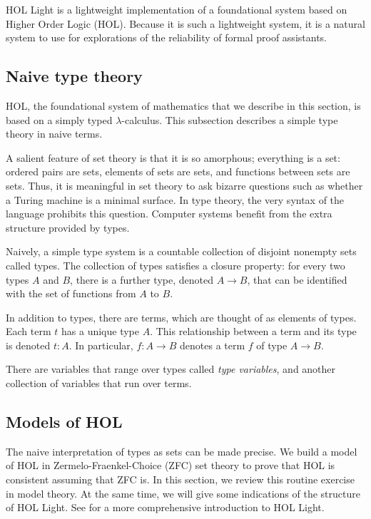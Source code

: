 \documentclass[brochure,english,12pt]{bourbaki}
\theoremstyle{plain}
\begin{document}
HOL Light is a lightweight implementation of a foundational system
based on Higher Order Logic (HOL).  Because it is such a lightweight
system, it is a natural system to use for explorations of the
reliability of formal proof assistants.

\subsection{Naive type theory}

HOL, the foundational system of mathematics that we describe in this
section, is based on a simply typed $\lambda$-calculus.  This
subsection describes a simple type theory in naive terms.

A salient feature of set theory is that it is so amorphous; everything
is a set: ordered pairs are sets, elements of sets are sets, and
functions between sets are sets.  Thus, it is meaningful in set theory
to ask bizarre questions such as whether a Turing machine is a minimal
surface.  In type theory, the very syntax of the language prohibits
this question.  Computer systems benefit from the extra structure
provided by types.

Naively, a simple type system is a countable collection of disjoint
nonempty sets called types.  The collection of types satisfies a
closure property: for every two types $A$ and $B$, there is a further
type, denoted $A\to B$, that can be identified with the set of
functions from $A$ to $B$.

In addition to types, there are terms, which are thought of as
elements of types.  Each term $t$ has a unique type $A$.  This
relationship between a term and its type is denoted $t:A$.  In
particular, $f:A\to B$ denotes a term $f$ of type $A\to B$.

There are variables that range over types called {\it type variables},
and another collection of variables that run over terms.


\subsection{Models of HOL}

The naive interpretation of types as sets can be made precise.  We
build a model of HOL in Zermelo-Fraenkel-Choice (ZFC) set theory to
prove that HOL is consistent assuming that ZFC is.  In this section,
we review this routine exercise in model theory.  At the same time, we
will give some indications of the structure of HOL Light.  See
\cite{harrison2009hol} for a more comprehensive introduction to HOL
Light.
\end{document}
